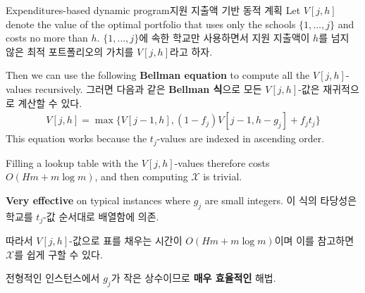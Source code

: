 \documentclass[11pt,mathserif,notheorems]{beamer}
\theoremstyle{definition}
\theoremstyle{definition}
\begin{document}
\begin{frame}{\ifen Expenditures-based dynamic program\else 지원 지출액 기반 동적 계획\fi}
\ifen Let $V[j,h] $ denote the value of the optimal portfolio that uses only the schools $\{ 1, \dots, j\}$ and costs no more than $h$.
\else $\{ 1, \dots, j\}$에 속한 학교만 사용하면서 지원 지출액이 $h$를 넘지 않은 최적 포트폴리오의 가치를 $V[j, h]$라고 하자.\fi

\ifen Then we can use the following \textbf{Bellman equation} to compute all the $V[j, h]$-values recursively.
\else 그러면 다음과 같은 \textbf{Bellman 식}으로 모든 $V[j, h]$-값은 재귀적으로 계산할 수 있다. \fi
\begin{align*}
V[j, h] = \max\bigl\{ V[j-1, h], (1 - f_j) V[j-1, h-g_j] + f_j t_j \bigr\}
\end{align*}
\ifen
This equation works because the $t_j$-values are indexed in ascending order.

Filling a lookup table with the $V[j, h]$-values therefore costs $O(Hm + m\log m)$, and then computing $\mathcal{X}$ is trivial.

\textbf{Very effective} on typical instances where $g_j$ are small integers.
\else
이 식의 타당성은 학교를 $t_j$-값 순서대로 배열함에 의존.

따라서 $V[j, h]$-값으로 표를 채우는 시간이 $O(Hm + m\log m)$이며 이를 참고하면 $\mathcal{X}$를 쉽게 구할 수 있다.

전형적인 인스턴스에서 $g_j$가 작은 상수이므로 \textbf{매우 효율적인} 해법.
\fi
\end{frame}
\end{document}
